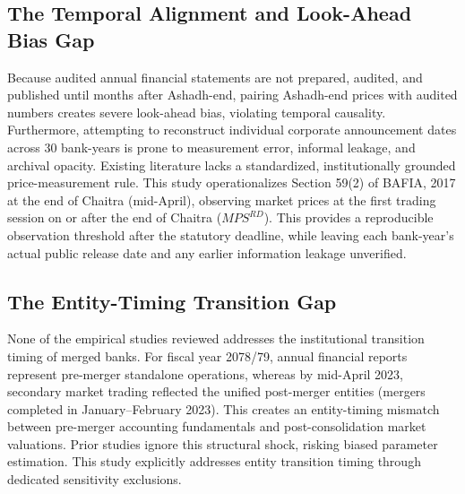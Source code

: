 \subsection{The Temporal Alignment and Look-Ahead Bias Gap}
Because audited annual financial statements are not prepared, audited, and published until months after Ashadh-end, pairing Ashadh-end prices with audited numbers creates severe look-ahead bias, violating temporal causality. Furthermore, attempting to reconstruct individual corporate announcement dates across 30 bank-years is prone to measurement error, informal leakage, and archival opacity. Existing literature lacks a standardized, institutionally grounded price-measurement rule. This study operationalizes Section 59(2) of BAFIA, 2017 at the end of Chaitra (mid-April), observing market prices at the first trading session on or after the end of Chaitra ($\mathit{MPS}^{RD}$). This provides a reproducible observation threshold after the statutory deadline, while leaving each bank-year's actual public release date and any earlier information leakage unverified.

\subsection{The Entity-Timing Transition Gap}
None of the empirical studies reviewed addresses the institutional transition timing of merged banks. For fiscal year 2078/79, annual financial reports represent pre-merger standalone operations, whereas by mid-April 2023, secondary market trading reflected the unified post-merger entities (mergers completed in January--February 2023). This creates an entity-timing mismatch between pre-merger accounting fundamentals and post-consolidation market valuations. Prior studies ignore this structural shock, risking biased parameter estimation. This study explicitly addresses entity transition timing through dedicated sensitivity exclusions.

